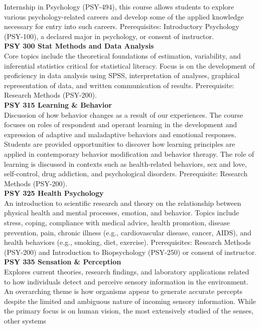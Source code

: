 \documentclass[
  letterpaper,
]{scrbook}
\begin{document}
Internship in Psychology (PSY-494), this course allows students to
explore various psychology-related careers and develop some of the
applied knowledge necessary for entry into such careers. Prerequisites:
Introductory Psychology (PSY-100), a declared major in psychology, or
consent of instructor.\\
\textbf{PSY 300 Stat Methods and Data Analysis}\\
Core topics include the theoretical foundations of estimation,
variability, and inferential statistics critical for statistical
literacy. Focus is on the development of proficiency in data analysis
using SPSS, interpretation of analyses, graphical representation of
data, and written communication of results. Prerequisite: Research
Methods (PSY-200).\\
\textbf{PSY 315 Learning \& Behavior}\\
Discussion of how behavior changes as a result of our experiences. The
course focuses on roles of respondent and operant learning in the
development and expression of adaptive and maladaptive behaviors and
emotional responses. Students are provided opportunities to discover how
learning principles are applied in contemporary behavior modification
and behavior therapy. The role of learning is discussed in contexts such
as health-related behaviors, sex and love, self-control, drug addiction,
and psychological disorders. Prerequisite: Research Methods (PSY-200).\\
\textbf{PSY 325 Health Psychology}\\
An introduction to scientific research and theory on the relationship
between physical health and mental processes, emotion, and behavior.
Topics include stress, coping, compliance with medical advice, health
promotion, disease prevention, pain, chronic illness (e.g.,
cardiovascular disease, cancer, AIDS), and health behaviors (e.g.,
smoking, diet, exercise). Prerequisites: Research Methods (PSY-200) and
Introduction to Biopsychology (PSY-250) or consent of instructor.\\
\textbf{PSY 335 Sensation \& Perception}\\
Explores current theories, research findings, and laboratory
applications related to how individuals detect and perceive sensory
information in the environment. An overarching theme is how organisms
appear to generate accurate percepts despite the limited and ambiguous
nature of incoming sensory information. While the primary focus is on
human vision, the most extensively studied of the senses, other systems
\end{document}
